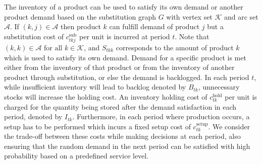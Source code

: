 \documentclass[10pt]{article}
\newcommand{\ti}{t} %
\newcommand{\ka}{k} %
\newcommand{\KA}{\mathcal{K}}
\newcommand{\jey}{j} %
\newcommand{\Graf}{\mathcal{A}} %
\newcommand{\Bi}{B} %
\begin{document}
The inventory of a product can be used to satisfy its own demand or another product demand based on the substitution graph $G$ with vertex set $\KA$ and arc set $\Graf$. If $(\ka, \jey) \in \Graf$ then product $\ka$  can fulfill demand of product $\jey$ but a substitution cost of $c^{\text{sub}}_{\ti \ka \jey }$ per unit is incurred at period $\ti$. Note that $(\ka, \ka) \in \Graf  \text{ for all } \ka \in \KA$, and $S_{\ti \ka \ka}$ corresponds to the amount of product $\ka$ which is used to satisfy its own demand.  Demand for a specific product is met either from the inventory of that product or from the inventory of another product through substitution, or else the demand is backlogged. In each period $\ti$, while insufficient inventory will lead to backlog denoted by $\Bi_{\ti \ka}$, unnecessary stocks will increase the holding cost. An inventory holding cost of $c^{\text{hold}}_{\ti \ka}$ per unit is charged for the quantity being stored after the demand satisfaction in each period, denoted by $I_{\ti \ka}$. Furthermore, in each period where production occurs, a setup has to be performed which incurs a fixed setup cost of $c^{\text{setup}}_{\ti \ka}$. We consider the trade-off between these costs while making decisions at each period, also ensuring that the random demand in the next period can be satisfied with high probability based on a predefined service level. 






\end{document}
